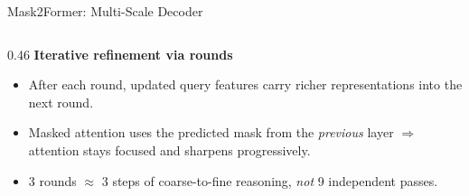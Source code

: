 \begin{frame}{Mask2Former: Multi-Scale Decoder}
\begin{columns}
\begin{column}{0.46\textwidth}
      \vspace{0.4em}
      \textbf{Iterative refinement via rounds}
      \begin{itemize}
        \item After each round, updated query features carry richer representations into the next round.
        \item Masked attention uses the predicted mask from the \emph{previous} layer $\Rightarrow$ attention stays focused and sharpens progressively.
        \item 3 rounds $\approx$ 3 steps of coarse-to-fine reasoning, \emph{not} 9 independent passes.
      \end{itemize}
    \end{column}
  \end{columns}
\end{frame}

